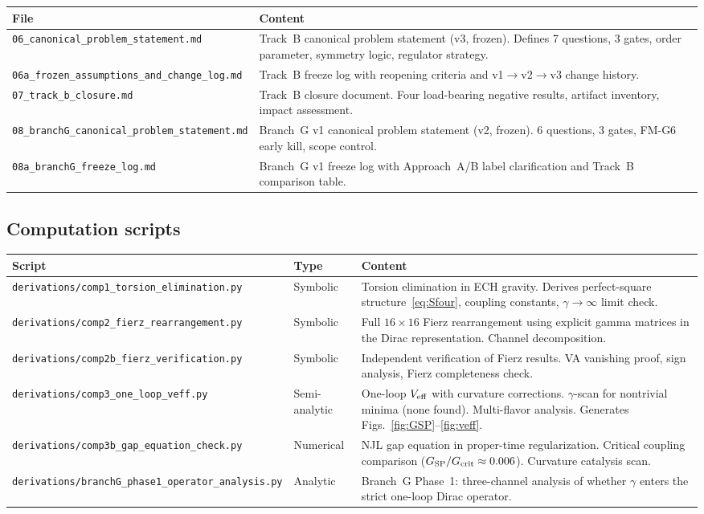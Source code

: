 \documentclass[11pt,letterpaper]{article}
\newcommand{\BI}{\gamma}               %
\newcommand{\Gsp}{G_{\rm SP}}
\newcommand{\Gcrit}{G_{\rm crit}}
\newcommand{\Veff}{V_{\rm eff}}
\begin{document}
\begin{longtable}{@{}p{}p{}@{}}
\toprule
File & Content \\
\midrule
\texttt{06\_canonical\_problem\_statement.md} &
  Track~B canonical problem statement (v3, frozen).
  Defines 7 questions, 3 gates, order parameter, symmetry logic,
  regulator strategy. \\
\texttt{06a\_frozen\_assumptions\_and\_change\_log.md} &
  Track~B freeze log with reopening criteria and v1$\to$v2$\to$v3
  change history. \\
\texttt{07\_track\_b\_closure.md} &
  Track~B closure document. Four load-bearing negative results,
  artifact inventory, impact assessment. \\
\texttt{08\_branchG\_canonical\_problem\_statement.md} &
  Branch~G v1 canonical problem statement (v2, frozen).
  6 questions, 3 gates, FM-G6 early kill, scope control. \\
\texttt{08a\_branchG\_freeze\_log.md} &
  Branch~G v1 freeze log with Approach~A/B label clarification
  and Track~B comparison table. \\
\bottomrule
\end{longtable}

\subsection{Computation scripts}

\begin{longtable}{@{}p{}p{}p{}@{}}
\toprule
Script & Type & Content \\
\midrule
\texttt{derivations/comp1\_torsion\_elimination.py} & Symbolic &
  Torsion elimination in ECH gravity. Derives perfect-square
  structure~\eqref{eq:Sfour}, coupling constants, $\BI\to\infty$
  limit check. \\
\texttt{derivations/comp2\_fierz\_rearrangement.py} & Symbolic &
  Full $16\times 16$ Fierz rearrangement using explicit gamma
  matrices in the Dirac representation. Channel decomposition. \\
\texttt{derivations/comp2b\_fierz\_verification.py} & Symbolic &
  Independent verification of Fierz results. VA vanishing proof,
  sign analysis, Fierz completeness check. \\
\texttt{derivations/comp3\_one\_loop\_veff.py} & Semi-analytic &
  One-loop $\Veff$ with curvature corrections. $\BI$-scan for
  nontrivial minima (none found). Multi-flavor analysis.
  Generates Figs.~\ref{fig:GSP}--\ref{fig:veff}. \\
\texttt{derivations/comp3b\_gap\_equation\_check.py} & Numerical &
  NJL gap equation in proper-time regularization. Critical
  coupling comparison ($\Gsp/\Gcrit\approx 0.006$). Curvature
  catalysis scan. \\
\texttt{derivations/branchG\_phase1\_operator\_analysis.py} & Analytic &
  Branch~G Phase~1: three-channel analysis of whether $\BI$
  enters the strict one-loop Dirac operator. \\
\bottomrule
\end{longtable}
\end{document}
